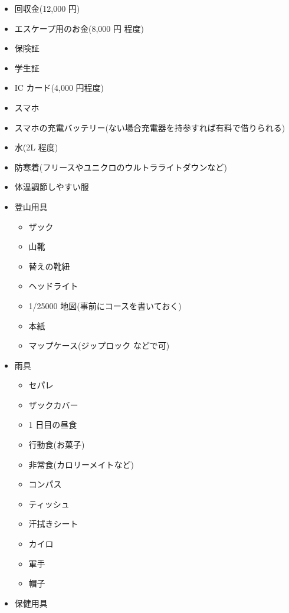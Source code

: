 \documentclass[b5paper,10pt]{ltjsarticle}
\begin{document}
\begin{multicols}{2}
    \begin{itemize}
        \item 回収金(12,000 円)
        \item エスケープ用のお金(8,000 円 程度)
        \item 保険証
        \item 学生証
        \item IC カード(4,000 円程度)
        \item スマホ
        \item スマホの充電バッテリー(ない場合充電器を持参すれば有料で借りられる)
        \item 水(2L 程度)
        \item 防寒着(フリースやユニクロのウルトラライトダウンなど)
        \item 体温調節しやすい服
        \item 登山用具
        \begin{itemize}
            \item ザック
            \item 山靴
            \item 替えの靴紐
            \item ヘッドライト
            \item 1/25000 地図(事前にコースを書いておく)
            \item 本紙
            \item マップケース(ジップロック などで可)
        \end{itemize}
        \item 雨具
        \begin{itemize}
            \item セパレ
            \item ザックカバー
            \item 1 日目の昼食
            \item 行動食(お菓子)
            \item 非常食(カロリーメイトなど)
            \item コンパス
            \item ティッシュ
            \item 汗拭きシート
            \item カイロ
            \item 軍手
            \item 帽子
        \end{itemize}
        \item 保健用具

\end{itemize}
\end{multicols}
\end{document}
